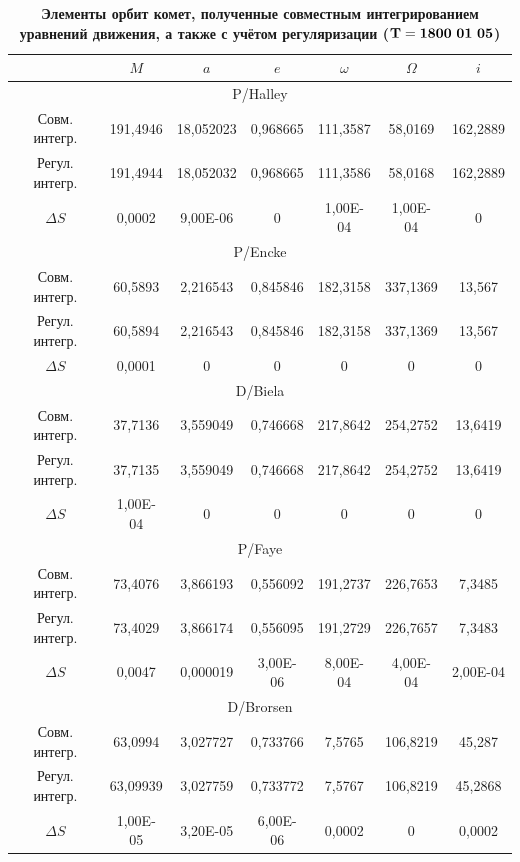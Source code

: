\begin{table}[p!]
\centering
 \begin{minipage}[t]{128mm} \small \centering
\caption{\bf Элементы орбит комет, полученные совместным интегрированием уравнений движения, а также с учётом регуляризации  ($\bf T=1800\ 01\ 05$) \vspace{-3mm}} \footnotesize
\begin{tabular}{c|c|c|c|c|c|c}
\hline
 &   $M$  &   $a$  &   $e$  &   $\omega$&   $\Omega$  &   $i$    \\ \hline
\multicolumn{7}{c}{P/Halley	}	\\	\hline
Совм. интегр.	&	191,4946	&	18,052023	&	0,968665	&	111,3587	&	58,0169	&	162,2889	\\
Регул. интегр.	&	191,4944	&	18,052032	&	0,968665	&	111,3586	&	58,0168	&	162,2889	\\
$\Delta S$	&	0,0002	&	9,00E-06	&	0	&	1,00E-04	&	1,00E-04	&	0	\\	\hline
\multicolumn{7}{c}{P/Encke	}	\\	\hline
Совм. интегр.	&	60,5893	&	2,216543	&	0,845846	&	182,3158	&	337,1369	&	13,567	\\
Регул. интегр.	&	60,5894	&	2,216543	&	0,845846	&	182,3158	&	337,1369	&	13,567	\\
$\Delta S$	&	0,0001	&	0	&	0	&	0	&	0	&	0	\\	\hline
\multicolumn{7}{c}{D/Biela	}	\\	\hline
Совм. интегр.	&	37,7136	&	3,559049	&	0,746668	&	217,8642	&	254,2752	&	13,6419	\\
Регул. интегр.	&	37,7135	&	3,559049	&	0,746668	&	217,8642	&	254,2752	&	13,6419	\\
$\Delta S$	&	1,00E-04	&	0	&	0	&	0	&	0	&	0	\\	\hline
\multicolumn{7}{c}{P/Faye	}	\\	\hline
Совм. интегр.	&	73,4076	&	3,866193	&	0,556092	&	191,2737	&	226,7653	&	7,3485	\\
Регул. интегр.	&	73,4029	&	3,866174	&	0,556095	&	191,2729	&	226,7657	&	7,3483	\\
$\Delta S$	&	0,0047	&	0,000019	&	3,00E-06	&	8,00E-04	&	4,00E-04	&	2,00E-04	\\	\hline
\multicolumn{7}{c}{D/Brorsen	}	\\	\hline
Совм. интегр.	&	63,0994	&	3,027727	&	0,733766	&	7,5765	&	106,8219	&	45,287	\\
Регул. интегр.	&	63,09939	&	3,027759	&	0,733772	&	7,5767	&	106,8219	&	45,2868	\\
$\Delta S$	&	1,00E-05	&	3,20E-05	&	6,00E-06	&	0,0002	&	0	&	0,0002	\\	\hline

\end{tabular}
\end{minipage}
\end{table}
